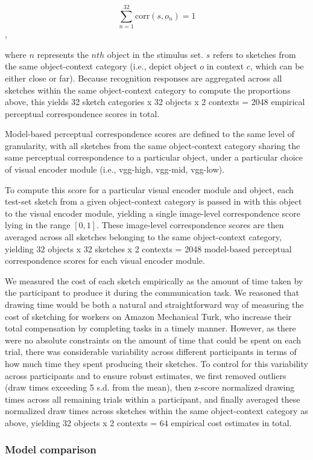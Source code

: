 \documentclass[9pt,twocolumn,twoside]{pnas-new}
\begin{document}
{$$\sum_{n=1}^{32} \textrm{corr} (s,o_{n}) = 1 $$,

where $n$ represents the $nth$ object in the stimulus set. $s$ refers to sketches from the same object-context category (i.e., depict object $o$ in context $c$, which can be either close or far). Because recognition responses are aggregated across all sketches within the same object-context category to compute the proportions above, this yields 32 sketch categories x 32 objects x 2 contexts = 2048 empirical perceptual correspondence scores in total.

Model-based perceptual correspondence scores are defined to the same level of granularity, with all sketches from the same object-context category sharing the same perceptual correspondence to a particular object, under a particular choice of visual encoder module (i.e., vgg-high, vgg-mid, vgg-low).

To compute this score for a particular visual encoder module and object, each test-set sketch from a given object-context category is passed in with this object to the visual encoder module, yielding a single image-level correspondence score lying in the range $[0,1]$. These image-level correspondence scores are then averaged across all sketches belonging to the same object-context category, yielding 32 objects x 32 sketches x 2 contexts  = 2048 model-based perceptual correspondence scores for each visual encoder module.

We measured the cost of each sketch empirically as the amount of time taken by the participant to produce it during the communication task. We reasoned that drawing time would be both a natural and straightforward way of measuring the cost of sketching for workers on Amazon Mechanical Turk, who increase their total compensation by completing tasks in a timely manner. However, as there were no absolute constraints on the amount of time that could be spent on each trial, there was considerable variability across different participants in terms of how much time they spent producing their sketches. To control for this variability across participants and to ensure robust estimates, we first removed outliers (draw times exceeding 5 s.d. from the mean), then z-score normalized drawing times across all remaining trials within a participant, and finally averaged these normalized draw times across sketches within the same object-context category as above, yielding 32 objects x 2 contexts = 64 empirical cost estimates in total.

\subsubsection*{Model comparison}

}
\end{document}
